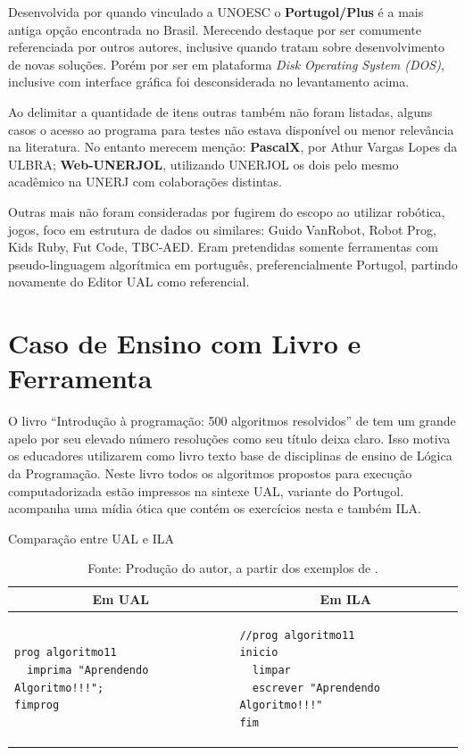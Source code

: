 Desenvolvida por  quando vinculado a UNOESC o \textbf{Portugol/Plus} é a mais antiga opção encontrada no Brasil. Merecendo destaque por ser comumente referenciada por outros autores, inclusive quando tratam sobre desenvolvimento de novas soluções. Porém por ser em plataforma \textit{Disk Operating System (DOS)}, inclusive com interface gráfica foi desconsiderada no levantamento acima.

Ao delimitar a quantidade de itens outras também não foram listadas, alguns casos o acesso ao programa para testes não estava disponível ou menor relevância na literatura. No entanto  merecem menção: \textbf{PascalX}, por Athur Vargas Lopes da ULBRA; \textbf{Web-UNERJOL}\nocite{ferrandin2005etal}, utilizando UNERJOL os dois pelo mesmo acadêmico na UNERJ com colaborações distintas.

Outras mais não foram consideradas por fugirem do escopo ao utilizar robótica, jogos, foco em estrutura de dados ou similares: Guido VanRobot, Robot Prog, Kids Ruby, Fut Code, TBC-AED. Eram pretendidas somente ferramentas com pseudo-linguagem algorítmica em português, preferencialmente Portugol, partindo novamente do Editor UAL como referencial.

\section{Caso de Ensino com Livro e Ferramenta}

O livro ``Introdução à programação: 500 algoritmos resolvidos'' de  tem um grande apelo por seu elevado número resoluções como seu título deixa claro. Isso motiva os educadores utilizarem como livro texto base de disciplinas de ensino de Lógica da Programação. Neste livro todos os algoritmos propostos para execução computadorizada estão impressos na sintexe UAL, variante do Portugol. acompanha uma mídia ótica que contém os exercícios nesta e também ILA.

\begin{table}[h]
\centering
  \caption{Comparação entre UAL e ILA}\label{tabela:compare-ualila}
\begin{tabular}{p{75mm} | p{75mm}}\hline
\multicolumn{1}{c|}{\textbf{Em UAL}} & \multicolumn{1}{c}{\textbf{Em ILA}} \\ \hline
\begin{lstlisting}[language=ual,style=table]
prog algoritmo11
  imprima "Aprendendo Algoritmo!!!";
fimprog
\end{lstlisting} &
\begin{lstlisting}[language=ila,style=table]
//prog algoritmo11
inicio
  limpar
  escrever "Aprendendo Algoritmo!!!"
fim
\end{lstlisting} \\ \hline
\end{tabular}
  \caption*{\ifdraft{\color{green}}{}\footnotesize Fonte: Produção do autor, a partir dos exemplos de .}
\end{table}

